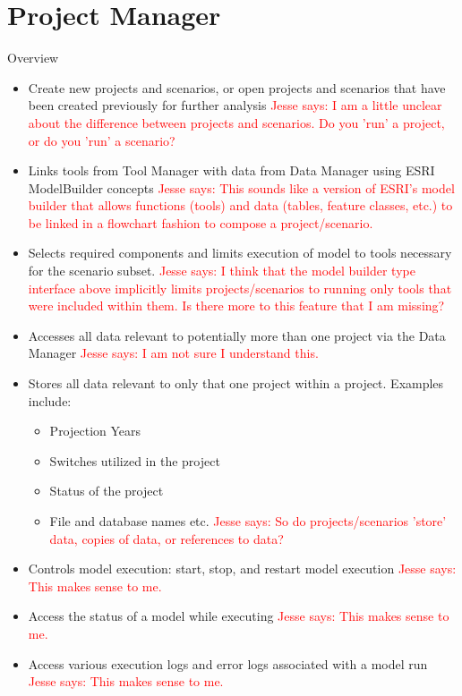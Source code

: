 \documentclass[titlepage]{article}
\begin{document}
\section{Project Manager}
Overview
\begin{itemize}
	\item Create new projects and scenarios, or open projects and scenarios that have been created previously for further analysis
		\textcolor{red}{Jesse says: I am a little unclear about the difference between projects and scenarios.  Do you 'run' a project, or do you 'run' a scenario?}
	\item Links tools from Tool Manager with data from Data Manager using ESRI ModelBuilder concepts
		\textcolor{red}{Jesse says: This sounds like a version of ESRI's model builder that allows functions (tools) and data (tables, feature classes, etc.) to be linked in a flowchart fashion to compose a project/scenario.}
	\item Selects required components and limits execution of model to tools necessary for the scenario subset.
		\textcolor{red}{Jesse says: I think that the model builder type interface above implicitly limits projects/scenarios to running only tools that were included within them.  Is there more to this feature that I am missing?} 
	\item Accesses all data relevant to potentially more than one project via the Data Manager
		\textcolor{red}{Jesse says: I am not sure I understand this.}
	\item Stores all data relevant to only that one project within a project. Examples include:
		\begin{itemize}
			\item Projection Years
			\item Switches utilized in the project
			\item Status of the project
			\item File and database names etc.
				\textcolor{red}{Jesse says: So do projects/scenarios 'store' data, copies of data, or references to data?}
		\end{itemize}
	\item Controls model execution: start, stop, and restart model execution
		\textcolor{red}{Jesse says: This makes sense to me.}
	\item Access the status of a model while executing
		\textcolor{red}{Jesse says: This makes sense to me.}
	\item Access various execution logs and error logs associated with a model run
		\textcolor{red}{Jesse says: This makes sense to me.}
\end{itemize}
\end{document}
